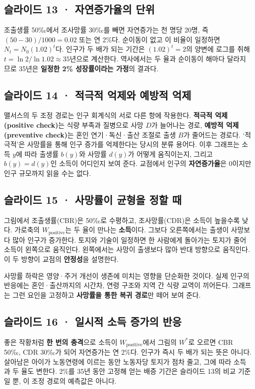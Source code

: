 \documentclass[10pt,a4paper]{article}
\begin{document}
\subsection{슬라이드 13 · 자연증가율의 단위}
조출생률 50‰에서 조사망률 30‰를 빼면 자연증가는 천 명당 20명, 즉 $(50-30)/1000=0.02$ 또는 연 2\%다. 순이동이 없고 이 비율이 일정하면 $N_t=N_0(1.02)^t$다. 인구가 두 배가 되는 기간은 $(1.02)^t=2$의 양변에 로그를 취해 $t=\ln 2/\ln 1.02\approx35$년으로 계산한다. 역사에서는 두 율과 순이동이 해마다 달라지므로 35년은 \textbf{일정한 2\% 성장률이라는 가정}의 결과다.\par

\subsection{슬라이드 14 · 적극적 억제와 예방적 억제}
맬서스의 두 조정 경로는 인구 회계식의 서로 다른 항에 작용한다. \textbf{적극적 억제(positive check)}는 식량 부족과 질병으로 사망 $D$가 늘어나는 경로, \textbf{예방적 억제(preventive check)}는 혼인 연기·독신·출산 조절로 출생 $B$가 줄어드는 경로다. ‘적극적’은 사망률을 통해 인구 증가를 억제한다는 당시의 분류 용어다. 이후 그래프는 소득 $y$에 따라 출생률 $b(y)$와 사망률 $d(y)$가 어떻게 움직이는지, 그리고 $b(y)=d(y)$인 소득이 어디인지 보여 준다. 교점에서 인구의 \textbf{자연증가율}은 0이지만 인구 규모까지 읽을 수는 없다.\par

\subsection{슬라이드 15 · 사망률이 균형을 정할 때}
그림에서 조출생률(CBR)은 50‰로 수평하고, 조사망률(CDR)은 소득이 높을수록 낮다. 가로축의 $W_{\mathrm{positive}}$는 두 율이 만나는 \textbf{소득}이다. 그보다 오른쪽에서는 출생이 사망보다 많아 인구가 증가한다. 토지와 기술이 일정하면 한 사람에게 돌아가는 토지가 줄어 소득이 왼쪽으로 움직인다. 왼쪽에서는 사망이 출생보다 많아 반대 방향으로 움직인다. 이 두 방향이 교점의 \textbf{안정성}을 설명한다.\par

사망률 하락은 영양·주거 개선이 생존에 미치는 영향을 단순화한 것이다. 실제 인구의 반응에는 혼인·출산까지의 시간차, 연령 구조와 지역 간 식량 교역이 끼어든다. 그래프는 그런 요인을 고정하고 \textbf{사망률을 통한 복귀 경로}만 떼어 보여 준다.\par

\subsection{슬라이드 16 · 일시적 소득 증가의 반응}
좋은 작황처럼 \textbf{한 번의 충격}으로 소득이 $W_{\mathrm{positive}}$에서 그림의 $W^*$로 오르면 CBR 50‰, CDR 30‰가 되어 자연증가는 연 2\%다. 인구가 즉시 두 배가 되는 뜻은 아니다. 살아남은 아이가 노동연령에 이르는 동안 노동자당 토지가 점차 줄고, 그에 따라 소득과 두 율도 변한다. 2\%를 35년 동안 고정해 얻는 배증 기간은 슬라이드 13의 비교 기준일 뿐, 이 조정 경로의 예측값은 아니다.\par
\end{document}

